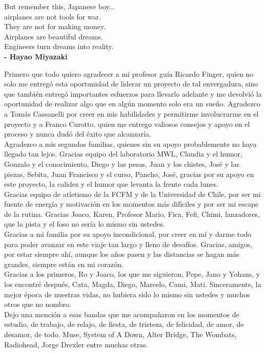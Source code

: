\documentclass[
	spanish, %
	letterpaper, oneside
]{book}
\begin{document}
\begin{dedicatory}
	But remember this, Japanese boy...\\
	airplanes are not tools for war.\\
	They are not for making money.\\ 
	Airplanes are beautiful dreams. \\
	Engineers turn dreams into reality.\\

	\textbf{- Hayao Miyazaki}
\end{dedicatory}

\begin{acknowledgments}
	Primero que todo quiero agradecer a mi profesor guía Ricardo Finger, quien no solo me entregó esta oportunidad de liderar un proyecto de tal envergadura, sino que también entregó importantes esfuerzos para llevarlo adelante y me devolvió la oportunidad de realizar algo que en algún momento solo era un sueño. Agradezco a Tomás Cassanelli por creer en mis habilidades y permitirme involucrarme en el proyecto y a Franco Curotto, quien me entrego valiosos consejos y apoyo en el proceso y nunca dudó del éxito que alcanzaría.\\

	Agradezco a mis segundas familias, quienes sin su apoyo probablemente no haya llegado tan lejos. Gracias equipo del laboratorio MWL, Claudia y el humor, Gonzalo y el conocimiento, Diego y las pesas, Juan y los chistes, José y las piezas, Sebita, Juan Francisco y el curso, Pancho, José, gracias por su apoyo en este proyecto, la calidez y el humor que levanta la frente cada lunes.\\

	Gracias equipo de atletismo de la FCFM y de la Universidad de Chile, por ser mi fuente de energía y motivación en los momentos más difíciles y por ser mi escape de la rutina. Gracias Joaco, Karen, Profesor Mario, Fica, Fefi, Chimi, lanzadores, que la pista y el foso no sería lo mismo sin ustedes.\\

	Gracias a mi familia por su apoyo incondicional, por creer en mí y darme todo para poder avanzar en este viaje tan largo y lleno de desafíos. Gracias, amigos, por estar siempre ahí, aunque los años pasen y las distancias se hagan más grandes, siempre están en mi corazón.\\

	Gracias a los primeros, Ro y Joaco, los que me siguieron, Pepe, Jano y Yohans, y los encontré después, Cata, Magda, Diego, Marcelo, Cami, Mati. Sinceramente, la mejor época de nuestras vidas, no hubiera sido lo mismo sin ustedes y muchos otros que no nombro.\\

	Dejo una mención a esas bandas que me acompañaron en los momentos de estudio, de trabajo, de relajo, de fiesta, de tristeza, de felicidad, de amor, de desamor, de todo. Muse, System of A Down, Alter Bridge, The Wombats, Radiohead, Jorge Drexler entre muchas otras.\\
\end{acknowledgments}
\end{document}
